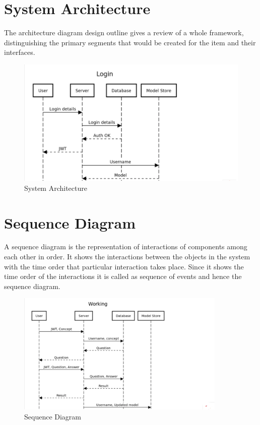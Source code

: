 \documentclass[12pt,a4paper,oneside]{report}
\begin{document}
\section{System Architecture}
The architecture diagram design outline gives a review of a whole framework, distinguishing the 
primary segments that would be created for the item and their interfaces.
\begin{figure}[h!]
\centering
  \includegraphics[width=\linewidth,scale=0.7]{login.png}
  \caption{System Architecture}
  \label{fig:Architecture}
\end{figure}
\pagebreak
\section{Sequence Diagram}
A sequence diagram is the representation of interactions of components among each
other in order. It shows the interactions between the objects in the system with the time order
that particular interaction takes place. Since it shows the time order of the interactions it is
called as sequence of events and hence the sequence diagram.

\begin{figure}[h!]
\centering
  \includegraphics[width=100mm,scale=0.6]{Working.png}
  \caption{Sequence Diagram}
  \label{fig:Sequence}
\end{figure}
\pagebreak 
\end{document}
